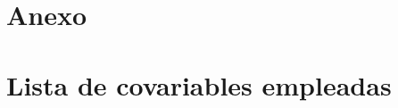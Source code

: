 \documentclass[11pt]{article}
\begin{document}






\printbibliography

\section*{Anexo}

\section*{Lista de covariables empleadas}
\end{document}
